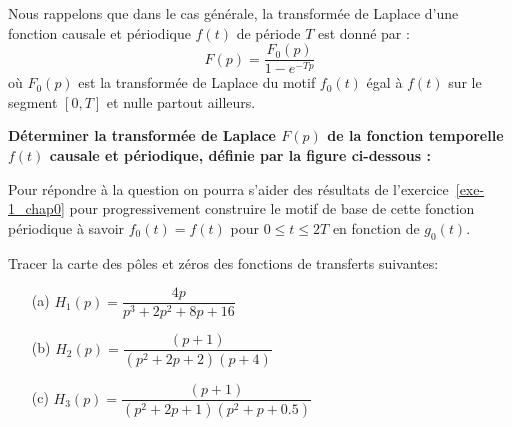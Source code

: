 Nous rappelons que dans le cas générale, 
la transformée de Laplace d'une fonction causale et périodique $f(t)$ de 
période $T$ est donné par :
$$
F(p) = \dfrac{F_0(p)}{1-e^{-Tp}}
$$
où $F_0(p)$ est la transformée de Laplace du motif $f_0(t)$ égal à $f(t)$ 
sur le segment $[0,T]$ et nulle partout ailleurs.

\question{}
\textbf{Déterminer la transformée de Laplace $F(p)$ de la fonction 
        temporelle $f(t)$ causale et périodique, définie par la figure 
        ci-dessous :}

\begin{center}
\end{center}

Pour répondre à la question on pourra s'aider des résultats de 
l'exercice~\ref{exe-1_chap0} pour progressivement construire le motif de 
base de cette fonction périodique à savoir $f_0(t)=f(t)$ pour 
$0\leq t\leq2T$ en fonction de $g_0(t)$.


\question{}
Tracer la carte des pôles et zéros des fonctions de transferts suivantes:
\begin{itemize}
    \item[(a)] $H_1(p)=\dfrac{4p}{p^3+2p^2+8p+16}$
    \item[(b)] $H_2(p)=\dfrac{(p+1)}{(p^2+2p+2)(p+4)}$
    \item[(c)] $H_3(p)=\dfrac{(p+1)}{(p^2+2p+1)(p^2+p+0.5)}$
\end{itemize}
